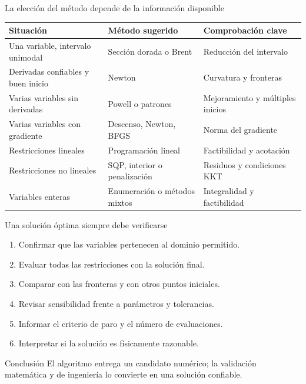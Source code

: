 \documentclass[../../main.tex]{subfiles}
\begin{document}
\begin{frame}{La elección del método depende de la información disponible}
\small
\begin{tabular}{p{}p{}p{}}
\toprule
\textbf{Situación} & \textbf{Método sugerido} & \textbf{Comprobación clave}\\
\midrule
Una variable, intervalo unimodal & Sección dorada o Brent & Reducción del intervalo\\
Derivadas confiables y buen inicio & Newton & Curvatura y fronteras\\
Varias variables sin derivadas & Powell o patrones & Mejoramiento y múltiples inicios\\
Varias variables con gradiente & Descenso, Newton, BFGS & Norma del gradiente\\
Restricciones lineales & Programación lineal & Factibilidad y acotación\\
Restricciones no lineales & SQP, interior o penalización & Residuos y condiciones KKT\\
Variables enteras & Enumeración o métodos mixtos & Integralidad y factibilidad\\
\bottomrule
\end{tabular}
\end{frame}

\begin{frame}{Una solución óptima siempre debe verificarse}
\begin{enumerate}
  \item Confirmar que las variables pertenecen al dominio permitido.
  \item Evaluar todas las restricciones con la solución final.
  \item Comparar con las fronteras y con otros puntos iniciales.
  \item Revisar sensibilidad frente a parámetros y tolerancias.
  \item Informar el criterio de paro y el número de evaluaciones.
  \item Interpretar si la solución es físicamente razonable.
\end{enumerate}

\begin{alertblock}{Conclusión}
El algoritmo entrega un candidato numérico; la validación matemática y de ingeniería lo convierte en una solución confiable.
\end{alertblock}
\end{frame}
\end{document}
